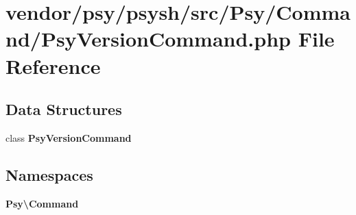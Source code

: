 \section{vendor/psy/psysh/src/\+Psy/\+Command/\+Psy\+Version\+Command.php File Reference}
\label{_psy_version_command_8php}
\subsection*{Data Structures}
\begin{DoxyCompactItemize}
\item 
class {\bf Psy\+Version\+Command}
\end{DoxyCompactItemize}
\subsection*{Namespaces}
\begin{DoxyCompactItemize}
\item 
 {\bf Psy\textbackslash{}\+Command}
\end{DoxyCompactItemize}
